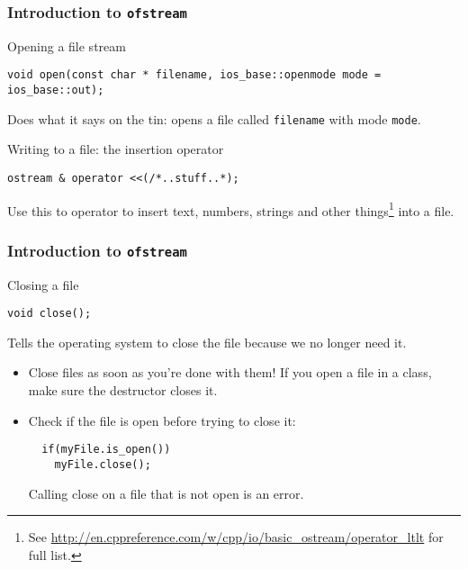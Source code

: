 \documentclass{beamer}
\begin{document}
\begin{frame}[fragile]
  \frametitle{Introduction to \texttt{ofstream}}
  \begin{block}{Opening a file stream}
  	\begin{lstlisting}[aboveskip=0pt]
  void open(const char * filename, ios_base::openmode mode = ios_base::out);
  	\end{lstlisting}
		Does what it says on the tin: opens a file called \texttt{filename} with mode \texttt{mode}.
  
  \end{block}
  \pause
  \begin{block}{Writing to a file: the insertion operator}
  \begin{lstlisting}[aboveskip=0pt]
  ostream & operator <<(/*..stuff..*);
  \end{lstlisting}
  Use this to operator to insert text, numbers, strings and other things\footnote{See \url{http://en.cppreference.com/w/cpp/io/basic_ostream/operator_ltlt} for full list.} into a file.
  \end{block}
  
\end{frame}

\begin{frame}[fragile]
  \frametitle{Introduction to \texttt{ofstream}}
  
  \begin{block}{Closing a file}
  \begin{lstlisting}[aboveskip=0pt]
  void close();
  \end{lstlisting}
  Tells the operating system to close the file because we no longer need it.
  \end{block}
  \pause
  \begin{doblocke}
    \begin{itemize}
      \item{Close files as soon as you're done with them!  If you open a file in a class, make sure the destructor closes it.}
      \pause
      \item{Check if the file is open before trying to close it:
      \begin{lstlisting}
  if(myFile.is_open())
    myFile.close();
      \end{lstlisting}
      Calling close on a file that is not open is an error.}
    \end{itemize}
  \end{doblocke}
  
\end{frame}
\end{document}
